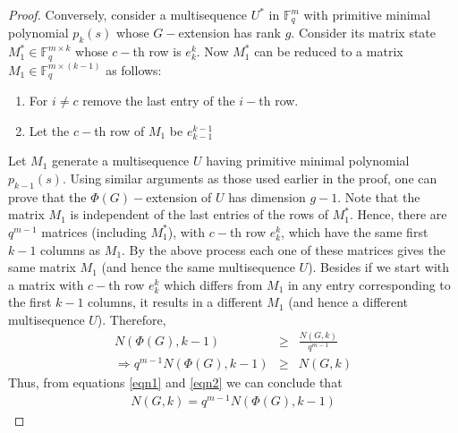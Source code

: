 \documentclass[letterpaper, 12 pt]{article}  \usepackage{amssymb}
\newcommand{\F}{\mathbb{F}}
\begin{document}
\begin{proof}
Conversely, consider a multisequence $U^*$ in $\F_q^m$ with primitive minimal
polynomial $p_k(s)$ whose $G-$extension has rank $g$. Consider its matrix state
$M_1^* \in \F_q^{m \times k}$ whose $c-$th row is $e_k^k$. Now $M_1^*$ can be
reduced to a matrix  $M_1 \in \F_q^{m \times (k-1)}$ as follows:
\begin{enumerate}
 \item For $i \neq c$ remove the last entry of the $i-$th row.
 \item Let the $c-$th row of $M_1$ be $e_{k-1}^{k-1}$
\end{enumerate}
 
Let $M_1$ generate a multisequence $U$ having primitive minimal polynomial $p_{k-1}(s)$. Using similar arguments as those used earlier in the proof, one can prove that
the $\Phi(G)-$extension of $U$ has dimension $g-1$. 
 Note that the matrix $M_1$ is independent  of  the last entries of the rows of
$M_1^*$. Hence, there are $q^{m-1}$ matrices (including $M_1^*$),
 with $c-$th row $e_{k}^{k}$, which have the same first $k-1$ columns as
 $M_1$.  By the above process each one of these matrices 
  gives the same matrix $M_1$ (and hence the same multisequence $U$).
 Besides if we start with a matrix with $c-$th row $e_{k}^{k}$ which differs
from $M_1$ in any entry corresponding to the first $k-1$ columns, it results
in a different $M_1$ (and hence a different multisequence $U$). Therefore,
 \begin{eqnarray}
 \label{eqn2}
 N(\Phi(G),{k-1}) &\geq& \frac{ N(G,{k})}{q^{m-1}}  \\
 \Rightarrow q^{m-1}N(\Phi(G),{k-1}) &\geq& N(G,{k}) \nonumber
 \end{eqnarray}
 Thus, from equations \eqref{eqn1} and \eqref{eqn2} we can conclude that
 \begin{eqnarray*}
  N(G,{k}) = q^{m-1}N(\Phi(G),{k-1})
 \end{eqnarray*}

\end{proof}
\end{document}

